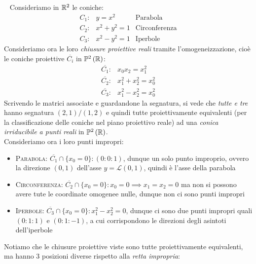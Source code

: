\begin{examples}~{}
	Consideriamo in $\mathbb{R}^2$ le coniche:
	\begin{equation*}
		\begin{array}{cll}
			C_1\colon & y=x^2 & 	\text{Parabola}\\[1mm]
			C_2\colon & x^2+y^2=1 &		\text{Circonferenza}\\[1mm]
			C_3\colon &	x^2-y^2=1 & \text{Iperbole}
		\end{array}
	\end{equation*}
	Consideriamo ora le loro \textit{chiusure proiettive reali} tramite l'omogeneizzazione, cioè le coniche proiettive $\overline{C_i}$ in $\proj[2]{\realset}$:
		\begin{equation*}
		\begin{array}{cl}
			\overline{C_1} \colon & x_0x_2=x_1^2\\[1mm]
			\overline{C_2} \colon & x_1^2+x_2^2=x_0^2\\[1mm]
			\overline{C_3} \colon & x_1^2-x_2^2=x_0^2
		\end{array}
	\end{equation*}
	Scrivendo le matrici associate e guardandone la segnatura, si vede che \textit{tutte e tre} hanno segnatura $(2,1)/(1,2)$ e quindi tutte proiettivamente equivalenti (per la classificazione delle coniche nel piano proiettivo reale) ad una \textit{conica irriducibile a punti reali} in $\proj[2]{\realset}$.\\
	Consideriamo ora i loro punti impropri:
		\begin{itemize}
			\item \textsc{Parabola}: $\overline{C_1}\cap\{x_0=0\}\colon (0\colon 0\colon 1)$, dunque un solo punto improprio, ovvero la direzione $(0,1)$ dell'asse $y=\mathcal{L}(0,1)$, quindi è l'asse della parabola
			\item \textsc{Circonferenza}: $\overline{C_2}\cap \{x_0=0\} \colon x_0=0 \implies x_1=x_2=0$ ma non si possono avere tute le coordinate omogenee nulle, dunque non ci sono punti impropri
			\item \textsc{Iperbole}: $\overline{C_3}\cap\{x_0=0\}\colon x_1^2-x_2^2=0$, dunque ci sono	due punti impropri quali $(0\colon 1\colon 1)$ e $(0\colon 1\colon -1)$, a cui corrispondono le direzioni degli asintoti dell'iperbole
		\end{itemize}
	Notiamo che le chiusure proiettive viste sono tutte proiettivamente equivalenti, ma hanno 3 posizioni diverse rispetto alla \textit{retta impropria}:\\

\end{examples}

